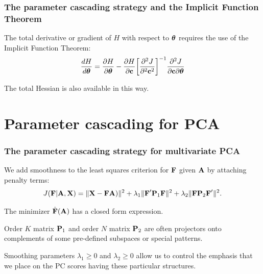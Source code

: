 \documentclass[11pt]{beamer}
\begin{document}

\begin{frame}

\frametitle{The parameter cascading strategy and the Implicit Function Theorem}

\bi
  \item The total derivative or gradient of $H$ with respect to $\mbox{\boldmath${\theta}$}$ requires the use of the Implicit Function Theorem:
    \[
        \frac{dH}{d \mbox{\boldmath${\theta}$}} = \frac{\partial H}{\partial \mbox{\boldmath${\theta}$}} -
        \frac{\partial H}{\partial \mbox{\bf c}} \bigg[\frac{\partial^2 J}{\partial^2 \mbox{\bf c}^2}\bigg]^{-1}
        \frac{\partial^2 J}{\partial \mbox{\bf c} \partial \mbox{\boldmath${\theta}$}}
    \]
  \item The total Hessian is also available in this way.
\ei

\end{frame}


\section{Parameter cascading for PCA}


\begin{frame}

\frametitle{The parameter cascading strategy for multivariate PCA}

\bi
  \item We add smoothness to the least squares criterion for $\mbox{\bf F}$ given $\mbox{\bf A}$ by attaching penalty terms:
  \[
    J(\mbox{\bf F}|\mbox{\bf A},\mbox{\bf X}) = \| \mbox{\bf X} - \mbox{\bf F} \mbox{\bf A}) \|^2 +
              \lambda_1 \| \mbox{\bf F}' \mbox{\bf P}_1 \mbox{\bf F} \|^2 + \lambda_2 \| \mbox{\bf F}  \mbox{\bf P}_2 \mbox{\bf F}' \|^2.
  \]
  \item The minimizer $\hat{\mbox{\bf F}}(\mbox{\bf A})$ has a closed form expression.
  \item Order $K$ matrix $\mbox{\bf P}_1$ and order $N$ matrix $\mbox{\bf P}_2$ are often projectors onto complements of some pre-defined subspaces or special patterns.
  \item Smoothing parameters $\lambda_1 \geq 0$ and $\lambda_2 \geq 0$ allow us to control the emphasis that we place on the PC scores having these particular structures.
\ei

\end{frame}
\end{document}
